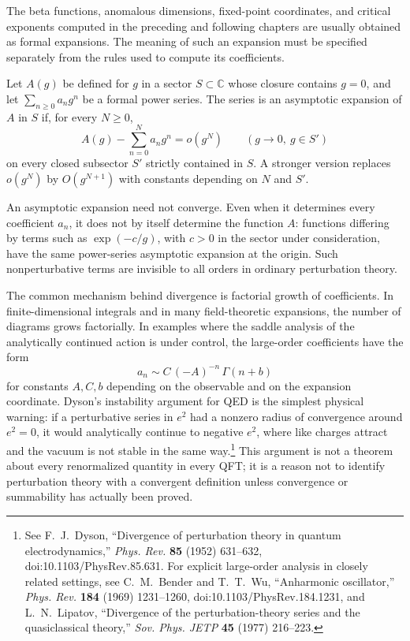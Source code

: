 The beta functions, anomalous dimensions, fixed-point coordinates, and
critical exponents computed in the preceding and following chapters are
usually obtained as formal expansions.  The meaning of such an expansion must
be specified separately from the rules used to compute its coefficients.

\begin{definition}
Let \(A(g)\) be defined for \(g\) in a sector \(S\subset\mathbb C\) whose
closure contains \(g=0\), and let \(\sum_{n\ge0}a_n g^n\) be a formal power
series.  The series is an asymptotic expansion of \(A\) in \(S\) if, for every
\(N\ge0\),
\[
  A(g)-\sum_{n=0}^{N}a_ng^n
  =
  o(g^N)
  \qquad (g\to0,\ g\in S')
\]
on every closed subsector \(S'\) strictly contained in \(S\).  A stronger
version replaces \(o(g^N)\) by \(O(g^{N+1})\) with constants depending on
\(N\) and \(S'\).
\end{definition}

An asymptotic expansion need not converge.  Even when it determines every
coefficient \(a_n\), it does not by itself determine the function \(A\):
functions differing by terms such as \(\exp(-c/g)\), with \(c>0\) in the
sector under consideration, have the same power-series asymptotic expansion at
the origin.  Such nonperturbative terms are invisible to all orders in
ordinary perturbation theory.

The common mechanism behind divergence is factorial growth of coefficients.
In finite-dimensional integrals and in many field-theoretic expansions, the
number of diagrams grows factorially.  In examples where the saddle analysis
of the analytically continued action is under control, the large-order
coefficients have the form
\[
  a_n\sim C\,(-A)^{-n}\,\Gamma(n+b)
\]
for constants \(A,C,b\) depending on the observable and on the expansion
coordinate.  Dyson's instability argument for QED is the simplest physical
warning: if a perturbative series in \(e^2\) had a nonzero radius of
convergence around \(e^2=0\), it would analytically continue to negative
\(e^2\), where like charges attract and the vacuum is not stable in the same
way.\footnote{See F.~J.~Dyson, ``Divergence of perturbation theory in quantum
electrodynamics,'' \emph{Phys. Rev.} \textbf{85} (1952) 631--632,
doi:10.1103/PhysRev.85.631.  For explicit large-order analysis in closely
related settings, see C.~M.~Bender and T.~T.~Wu, ``Anharmonic oscillator,''
\emph{Phys. Rev.} \textbf{184} (1969) 1231--1260, doi:10.1103/PhysRev.184.1231,
and L.~N.~Lipatov, ``Divergence of the perturbation-theory series and the
quasiclassical theory,'' \emph{Sov. Phys. JETP} \textbf{45} (1977) 216--223.}
This argument is not a theorem about every renormalized quantity in every QFT;
it is a reason not to identify perturbation theory with a convergent
definition unless convergence or summability has actually been proved.

